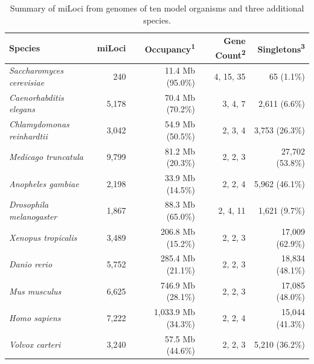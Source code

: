 \begin{table}[h]
\caption{Summary of miLoci from genomes of ten model organisms and three additional species.}
\label{Table:miLocusSummaryModOrg}
\begin{tabularx}{\textwidth}{p{4cm}rrrr}
\hline
                            Species &               miLoci & Occupancy\textsuperscript{1} & Gene Count\textsuperscript{2} & Singletons\textsuperscript{3}  \\ \hline
\textit{Saccharomyces \mbox{cerevisiae}}   &                  240 &             11.4 Mb (95.0\%) &                     4, 15, 35 &                    65 (1.1\%)  \\
\textit{Caenorhabditis \mbox{elegans}}     &                5,178 &             70.4 Mb (70.2\%) &                       3, 4, 7 &                 2,611 (6.6\%)  \\
\textit{Chlamydomonas \mbox{reinhardtii}}  &                3,042 &             54.9 Mb (50.5\%) &                       2, 3, 4 &                3,753 (26.3\%)  \\
\textit{Medicago truncatula}        &                9,799 &             81.2 Mb (20.3\%) &                       2, 2, 3 &               27,702 (53.8\%)  \\
\textit{Anopheles gambiae}          &                2,198 &             33.9 Mb (14.5\%) &                       2, 2, 4 &                5,962 (46.1\%)  \\
\textit{Drosophila melanogaster}    &                1,867 &             88.3 Mb (65.0\%) &                      2, 4, 11 &                 1,621 (9.7\%)  \\
\textit{Xenopus tropicalis}         &                3,489 &            206.8 Mb (15.2\%) &                       2, 2, 3 &               17,009 (62.9\%)  \\
\textit{Danio rerio}                &                5,752 &            285.4 Mb (21.1\%) &                       2, 2, 3 &               18,834 (48.1\%)  \\
\textit{Mus musculus}               &                6,625 &            746.9 Mb (28.1\%) &                       2, 2, 3 &               17,085 (48.0\%)  \\
\textit{Homo sapiens}               &                7,222 &          1,033.9 Mb (34.3\%) &                       2, 2, 4 &               15,044 (41.3\%)  \\ \hline
\textit{Volvox carteri}             &                3,240 &             57.5 Mb (44.6\%) &                       2, 2, 3 &                5,210 (36.2\%)  \\

\end{tabularx}
\end{table}
